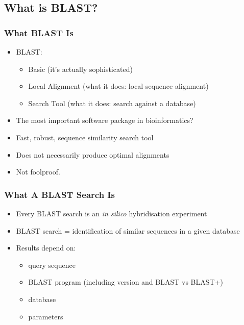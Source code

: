 %

\subsection{What is BLAST?}
  \begin{frame}
  \frametitle{What BLAST Is}
  \begin{itemize}
    \item<1-> BLAST:
    \begin{itemize}
      \item<1-> Basic (it's actually sophisticated)
      \item<1-> Local Alignment (what it does: local sequence alignment)
      \item<1-> Search Tool (what it does: search against a database)
    \end{itemize}
    \item<2-> The most important software package in bioinformatics?
    \item<2-> Fast, robust, sequence similarity search tool
    \item<2-> Does not necessarily produce optimal alignments
    \item<2-> Not foolproof.
  \end{itemize}
\end{frame}
  
\begin{frame}
  \frametitle{What A BLAST Search Is}
  \begin{itemize}
    \item Every BLAST search is an \textit{in silico} hybridisation experiment
    \item BLAST search = identification of similar sequences in a given database
    \item Results depend on:
    \begin{itemize}
      \item query sequence
      \item BLAST program (including version and BLAST vs BLAST+)
      \item database
      \item parameters
    \end{itemize}
  \end{itemize}
\end{frame}  